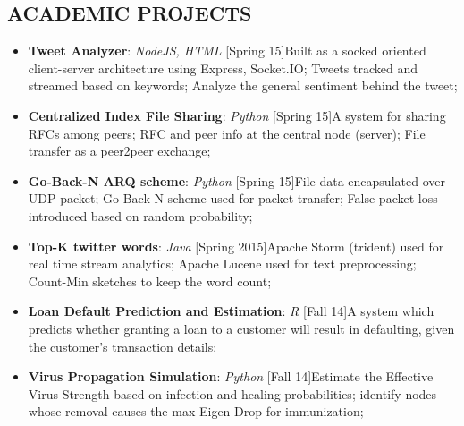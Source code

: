 \documentclass[11pt, letterpaper]{article}
\begin{document}
\begin{multicols}{2}
		\section*{ACADEMIC PROJECTS}
			\vspace{-0.1cm}
			\begin{itemize}[nolistsep,leftmargin=*]
				\item \textbf{Tweet Analyzer}: \textit{NodeJS, HTML} \hfill [Spring 15]\newline Built as a socked oriented client-server architecture using Express, Socket.IO; Tweets tracked and streamed based on keywords; Analyze the general sentiment behind the tweet;
				\item \textbf{Centralized Index File Sharing}: \textit{Python} \hfill [Spring 15]\newline A system for sharing RFCs among peers; RFC and peer info at the central node (server); File transfer as a peer2peer exchange; 
				\item \textbf{Go-Back-N ARQ scheme}: \textit{Python} \hfill [Spring 15]\newline File data encapsulated over UDP packet; Go-Back-N scheme used for packet transfer; False packet loss introduced based on random probability;
				\item \textbf{Top-K twitter words}: \textit{Java} \hfill [Spring 2015]\newline Apache Storm (trident) used for real time stream analytics; Apache Lucene used for text preprocessing; Count-Min sketches to keep the word count;
				\item \textbf{Loan Default Prediction and Estimation}: \textit{R} \hfill[Fall 14]\newline A system which predicts whether granting a loan to a customer will result in defaulting, given the customer's transaction details; 
				\item \textbf{Virus Propagation Simulation}: \textit{Python} \hfill [Fall 14]\newline Estimate the Effective Virus Strength based on infection and healing probabilities; identify nodes whose removal causes the max Eigen Drop for immunization;

\end{itemize}
\end{multicols}
\end{document}
